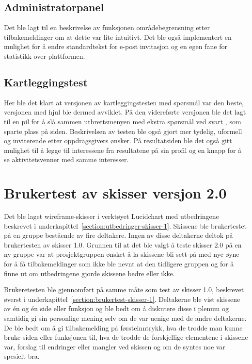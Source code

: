  \subsection{Administratorpanel}
 Det ble lagt til en beskrivelse av funksjonen områdebegrensning etter tilbakemeldinger om at dette var lite intuitivt. Det ble også implementert en mulighet for å endre standardtekst for e-post invitasjon og en egen fane for statistikk over plattformen.
 
 \subsection{Kartleggingstest}
 
 Her ble det klart at versjonen av kartleggingstesten med spørsmål var den beste, versjonen med hjul ble dermed avviklet. På den videreførte versjonen ble det lagt til en pil for å slå sammen utbrettsmenyen med ekstra spørsmål ved svart , som sparte plass på siden. Beskrivelsen av testen ble også gjort mer tydelig, uformell og inviterende etter oppdragsgivers ønsker. På resultatsiden ble det også gitt mulighet til å legge til interessene fra resultatene på sin profil og en knapp for å se aktivitetsvenner med samme interesser.
 
 
\section{Brukertest av skisser versjon 2.0}
\label{section:brukertest-skisser2.0}
 
Det ble laget wireframe-skisser i verktøyet Lucidchart med utbedringene beskrevet i underkapittel~\ref{section:utbedringer-skisser-1}. Skissene ble brukertestet på en gruppe bestående av fire deltakere. Ingen av disse deltakerne deltok på brukertesten av skisser 1.0. Grunnen til at det ble valgt å teste skisser 2.0 på en ny gruppe var at prosjektgruppen ønsket å la skissene bli sett på med nye øyne for å få tilbakemeldinger som ikke ble nevnt at den tidligere gruppen og for å finne ut om utbedringene gjorde skissene bedre eller ikke.


Brukeretesten ble gjennomført på samme måte som test av skisser 1.0, beskrevet øverst i  underkapittel~\ref{section:brukertest-skisser-1}. Deltakerne ble vist skissene av én og én side eller funksjon og ble bedt om å diskutere disse i plenum og samtidig gi sin personlige mening selv om de var uenige med de andre deltakerne. De ble bedt om å gi tilbakemelding på førsteinntrykk, hva de trodde man kunne bruke siden eller funksjonen til, hva de trodde de forskjellige elementene i skissene var, forslag til endringer eller mangler ved skissen og om de syntes noe var spesielt bra.

